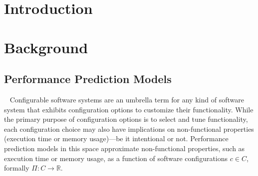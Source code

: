 \section{Introduction}


\section{Background}
\subsection{Performance Prediction Models}~\label{sec:perfmodels}
Configurable software systems are an umbrella term for any kind of software system that exhibits configuration options to customize their functionality. While the primary purpose of configuration options is to select and tune functionality, each configuration choice may also have implications on non-functional properties (execution time or memory usage)---be it intentional or not. 
Performance prediction models in this space approximate non-functional properties, such as execution time or memory usage, as a function of software configurations $c \in C$, formally $\Pi: C \rightarrow \mathbb{R}$. 


